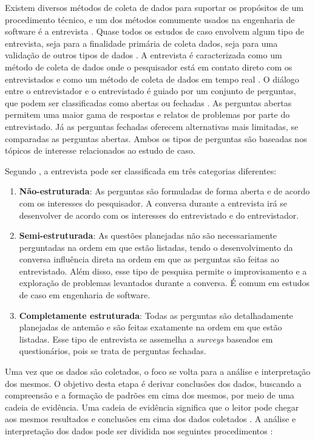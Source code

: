 Existem diversos métodos de coleta de dados para suportar os propósitos de um procedimento técnico, e um dos métodos comumente usados na engenharia de software é a entrevista \cite{caseStudySE}. Quase todos os estudos de caso envolvem algum tipo de entrevista, seja para a finalidade primária de coleta dados, seja para uma validação de outros tipos de dados \cite{caseStudySE}. A entrevista é caracterizada como um método de coleta de dados onde o pesquisador está em contato direto com os entrevistados e como um método de coleta de dados em tempo real \cite{caseStudySE}. O diálogo entre o entrevistador e o entrevistado é guiado por um conjunto de perguntas, que podem ser classificadas como abertas ou fechadas \cite{caseStudySE}. As perguntas abertas permitem uma maior gama de respostas e relatos de problemas por parte do entrevistado. Já as perguntas fechadas oferecem alternativas mais limitadas, se comparadas as perguntas abertas. Ambos os tipos de perguntas são baseadas nos tópicos de interesse relacionados ao estudo de caso.

Segundo , a entrevista pode ser classificada em três categorias diferentes:
\begin{enumerate}
	\item \textbf{Não-estruturada}: As perguntas são formuladas de forma aberta e de acordo com os interesses do pesquisador. A conversa durante a entrevista irá se desenvolver de acordo com os interesses do entrevistado e do entrevistador.
	\item \textbf{Semi-estruturada}: As questões planejadas não são necessariamente perguntadas na ordem em que estão listadas, tendo o desenvolvimento da conversa influência direta na ordem em que as perguntas são feitas ao entrevistado. Além disso, esse tipo de pesquisa permite o improvisamento e a exploração de problemas levantados durante a conversa. É comum em estudos de caso em engenharia de software.
	\item \textbf{Completamente estruturada}: Todas as perguntas são detalhadamente planejadas de antemão e são feitas exatamente na ordem em que estão listadas. Esse tipo de entrevista se assemelha a \textit{surveys} baseados em questionários, pois se trata de perguntas fechadas.
\end{enumerate}

Uma vez que os dados são coletados, o foco se volta para a análise e interpretação dos mesmos. O objetivo desta etapa é derivar conclusões dos dados, buscando a compreensão e a formação de padrões em cima dos mesmos, por meio de uma cadeia de evidência. Uma cadeia de evidência significa que o leitor pode chegar aos mesmos resultados e conclusões em cima dos dados coletados \cite{caseStudySE}. A análise e interpretação dos dados pode ser dividida nos seguintes procedimentos \cite{caseStudySE}:

